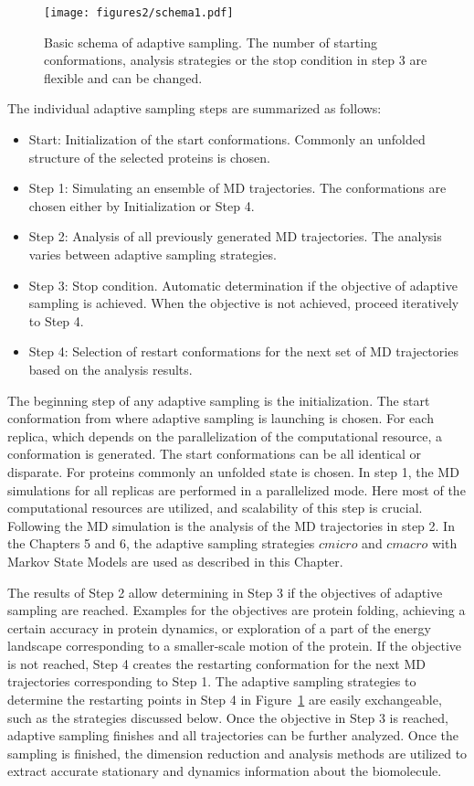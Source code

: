 \begin{figure}[h]
  \centering
  \texttt{[image: figures2/schema1.pdf]}
  \caption{Basic schema of adaptive sampling. The
  number of starting conformations, analysis strategies or the stop condition in step 3 are flexible and can be changed.}
  \label{fig:schema2}
\end{figure}

The individual adaptive sampling steps are summarized as follows:
\begin{itemize}
\item Start: Initialization of the start conformations.  Commonly an unfolded structure of the selected proteins is chosen.
\item Step 1: Simulating an ensemble of MD trajectories. The conformations are chosen either by Initialization or Step 4. 
\item Step 2: Analysis of all previously generated MD trajectories. The analysis varies between adaptive sampling strategies.
\item Step 3: Stop condition. Automatic determination if the objective of adaptive sampling is achieved. When the objective is not achieved, proceed iteratively to Step 4. 
\item Step 4: Selection of restart conformations for the next set of MD trajectories based on the analysis results. 
\end{itemize}

The beginning step of any adaptive sampling is the initialization. The start conformation from where adaptive sampling is launching is chosen. For each replica, which depends on the parallelization of the computational resource, a conformation is generated. The start conformations can be all identical or disparate. For proteins commonly an unfolded state is chosen.
In step 1, the MD simulations for all replicas are performed in a parallelized mode. Here most of the computational resources are utilized, and scalability of this step is crucial. Following the MD simulation is the analysis of the MD trajectories in step 2. In the Chapters 5 and 6, the adaptive sampling strategies $cmicro$ and $cmacro$ with Markov State Models \cite{prinz2011markov} are used as described in this Chapter. 

The results of Step 2 allow determining in Step 3 if the objectives of adaptive sampling are reached. Examples for the objectives are protein folding, achieving a certain accuracy in protein dynamics, or exploration of a part of the energy landscape corresponding to a smaller-scale motion of the protein. If the objective is not reached, Step 4 creates the restarting conformation for the next MD trajectories corresponding to Step 1. The adaptive sampling strategies to determine the restarting points in Step 4 in Figure~\ref{fig:schema2} are easily exchangeable, such as the strategies discussed below. Once the objective in Step 3 is reached, adaptive sampling finishes and all trajectories can be further analyzed. Once the sampling is finished, the dimension reduction and analysis methods are utilized to extract accurate stationary and dynamics information about the biomolecule.


